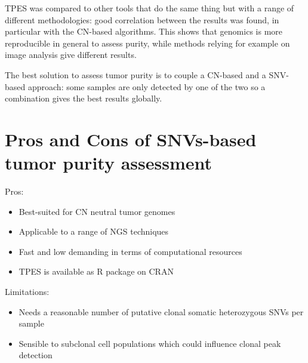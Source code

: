 TPES was compared to other tools that do the same thing but with a range of
different methodologies: good correlation between the results was found, in
particular with the CN-based algorithms. This shows that genomics is more
reproducible in general to assess purity, while methods relying for example on
image analysis give different results.

The best solution to assess tumor purity is to couple a CN-based and a
SNV-based approach: some samples are only detected by one of the two so a
combination gives the best results globally.

\section{Pros and Cons of SNVs-based tumor purity assessment}
Pros:
\begin{itemize}
    \item Best-suited for CN neutral tumor genomes
    \item Applicable to a range of NGS techniques
    \item Fast and low demanding in terms of computational resources
    \item TPES is available as R package on CRAN
\end{itemize}
Limitations:
\begin{itemize}
    \item Needs a reasonable number of putative clonal somatic heterozygous SNVs
    per sample
    \item  Sensible to subclonal cell populations which could influence clonal
    peak detection
\end{itemize}
